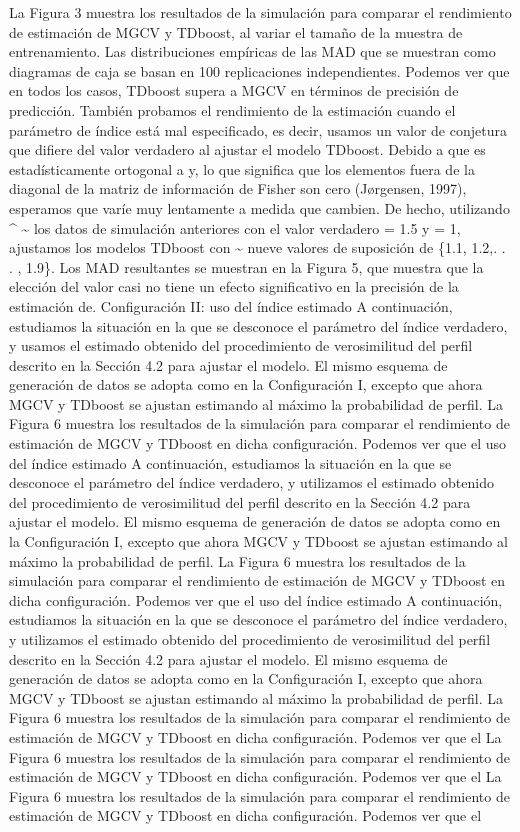 \documentclass[]{article}
\begin{document}
La Figura 3 muestra los resultados de la simulación para comparar el
rendimiento de estimación de MGCV y TDboost, al variar el tamaño de la
muestra de entrenamiento. Las distribuciones empíricas de las MAD que se
muestran como diagramas de caja se basan en 100 replicaciones
independientes. Podemos ver que en todos los casos, TDboost supera a
MGCV en términos de precisión de predicción. También probamos el
rendimiento de la estimación cuando el parámetro de índice está mal
especificado, es decir, usamos un valor de conjetura que difiere del
valor verdadero al ajustar el modelo TDboost. Debido a que es
estadísticamente ortogonal a y, lo que significa que los elementos fuera
de la diagonal de la matriz de información de Fisher son cero
(Jørgensen, 1997), esperamos que varíe muy lentamente a medida que
cambien. De hecho, utilizando \^{} \textasciitilde{} los datos de
simulación anteriores con el valor verdadero = 1.5 y = 1, ajustamos los
modelos TDboost con \textasciitilde{} nueve valores de suposición de
\{1.1, 1.2,. . . , 1.9\}. Los MAD resultantes se muestran en la Figura
5, que muestra que la elección del valor casi no tiene un efecto
significativo en la precisión de la estimación de. Configuración II: uso
del índice estimado A continuación, estudiamos la situación en la que se
desconoce el parámetro del índice verdadero, y usamos el estimado
obtenido del procedimiento de verosimilitud del perfil descrito en la
Sección 4.2 para ajustar el modelo. El mismo esquema de generación de
datos se adopta como en la Configuración I, excepto que ahora MGCV y
TDboost se ajustan estimando al máximo la probabilidad de perfil. La
Figura 6 muestra los resultados de la simulación para comparar el
rendimiento de estimación de MGCV y TDboost en dicha configuración.
Podemos ver que el uso del índice estimado A continuación, estudiamos la
situación en la que se desconoce el parámetro del índice verdadero, y
utilizamos el estimado obtenido del procedimiento de verosimilitud del
perfil descrito en la Sección 4.2 para ajustar el modelo. El mismo
esquema de generación de datos se adopta como en la Configuración I,
excepto que ahora MGCV y TDboost se ajustan estimando al máximo la
probabilidad de perfil. La Figura 6 muestra los resultados de la
simulación para comparar el rendimiento de estimación de MGCV y TDboost
en dicha configuración. Podemos ver que el uso del índice estimado A
continuación, estudiamos la situación en la que se desconoce el
parámetro del índice verdadero, y utilizamos el estimado obtenido del
procedimiento de verosimilitud del perfil descrito en la Sección 4.2
para ajustar el modelo. El mismo esquema de generación de datos se
adopta como en la Configuración I, excepto que ahora MGCV y TDboost se
ajustan estimando al máximo la probabilidad de perfil. La Figura 6
muestra los resultados de la simulación para comparar el rendimiento de
estimación de MGCV y TDboost en dicha configuración. Podemos ver que el
La Figura 6 muestra los resultados de la simulación para comparar el
rendimiento de estimación de MGCV y TDboost en dicha configuración.
Podemos ver que el La Figura 6 muestra los resultados de la simulación
para comparar el rendimiento de estimación de MGCV y TDboost en dicha
configuración. Podemos ver que el
\end{document}
